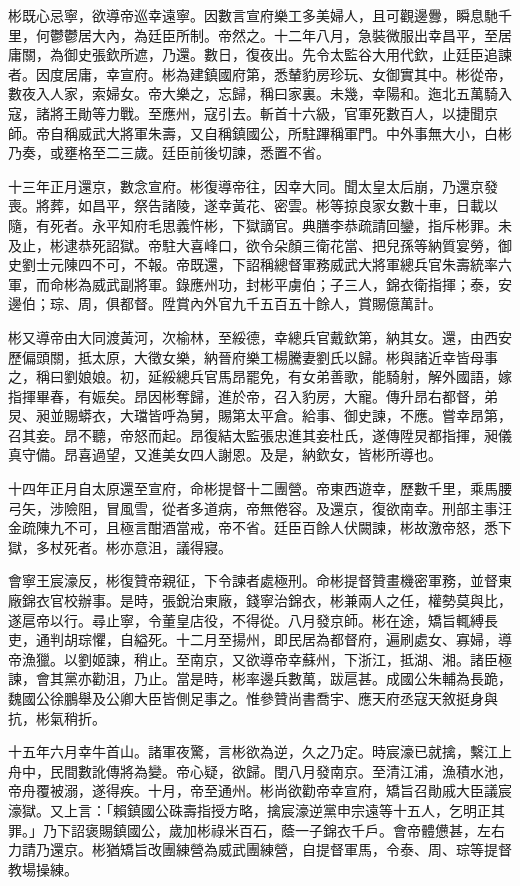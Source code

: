 \begin{pinyinscope}
彬既心忌寧，欲導帝巡幸遠寧。因數言宣府樂工多美婦人，且可觀邊釁，瞬息馳千里，何鬱鬱居大內，為廷臣所制。帝然之。十二年八月，急裝微服出幸昌平，至居庸關，為御史張欽所遮，乃還。數日，復夜出。先令太監谷大用代欽，止廷臣追諫者。因度居庸，幸宣府。彬為建鎮國府第，悉輦豹房珍玩、女御實其中。彬從帝，數夜入人家，索婦女。帝大樂之，忘歸，稱曰家裏。未幾，幸陽和。迤北五萬騎入寇，諸將王勛等力戰。至應州，寇引去。斬首十六級，官軍死數百人，以捷聞京師。帝自稱威武大將軍朱壽，又自稱鎮國公，所駐蹕稱軍門。中外事無大小，白彬乃奏，或壅格至二三歲。廷臣前後切諫，悉置不省。

十三年正月還京，數念宣府。彬復導帝往，因幸大同。聞太皇太后崩，乃還京發喪。將葬，如昌平，祭告諸陵，遂幸黃花、密雲。彬等掠良家女數十車，日載以隨，有死者。永平知府毛思義忤彬，下獄謫官。典膳李恭疏請回鑾，指斥彬罪。未及止，彬逮恭死詔獄。帝駐大喜峰口，欲令朵顏三衛花當、把兒孫等納質宴勞，御史劉士元陳四不可，不報。帝既還，下詔稱總督軍務威武大將軍總兵官朱壽統率六軍，而命彬為威武副將軍。錄應州功，封彬平虜伯；子三人，錦衣衛指揮；泰，安邊伯；琮、周，俱都督。陞賞內外官九千五百五十餘人，賞賜億萬計。

彬又導帝由大同渡黃河，次榆林，至綏德，幸總兵官戴欽第，納其女。還，由西安歷偏頭關，抵太原，大徵女樂，納晉府樂工楊騰妻劉氏以歸。彬與諸近幸皆母事之，稱曰劉娘娘。初，延綏總兵官馬昂罷免，有女弟善歌，能騎射，解外國語，嫁指揮畢春，有娠矣。昂因彬奪歸，進於帝，召入豹房，大寵。傳升昂右都督，弟炅、昶並賜蟒衣，大璫皆呼為舅，賜第太平倉。給事、御史諫，不應。嘗幸昂第，召其妾。昂不聽，帝怒而起。昂復結太監張忠進其妾杜氏，遂傳陞炅都指揮，昶儀真守備。昂喜過望，又進美女四人謝恩。及是，納欽女，皆彬所導也。

十四年正月自太原還至宣府，命彬提督十二團營。帝東西遊幸，歷數千里，乘馬腰弓矢，涉險阻，冒風雪，從者多道病，帝無倦容。及還京，復欲南幸。刑部主事汪金疏陳九不可，且極言酣酒當戒，帝不省。廷臣百餘人伏闕諫，彬故激帝怒，悉下獄，多杖死者。彬亦意沮，議得寢。

會寧王宸濠反，彬復贊帝親征，下令諫者處極刑。命彬提督贊畫機密軍務，並督東廠錦衣官校辦事。是時，張銳治東廠，錢寧治錦衣，彬兼兩人之任，權勢莫與比，遂扈帝以行。尋止寧，令董皇店役，不得從。八月發京師。彬在途，矯旨輒縛長吏，通判胡琮懼，自縊死。十二月至揚州，即民居為都督府，遍刷處女、寡婦，導帝漁獵。以劉姬諫，稍止。至南京，又欲導帝幸蘇州，下浙江，抵湖、湘。諸臣極諫，會其黨亦勸沮，乃止。當是時，彬率邊兵數萬，跋扈甚。成國公朱輔為長跪，魏國公徐鵬舉及公卿大臣皆側足事之。惟參贊尚書喬宇、應天府丞寇天敘挺身與抗，彬氣稍折。

十五年六月幸牛首山。諸軍夜驚，言彬欲為逆，久之乃定。時宸濠已就擒，繫江上舟中，民間數訛傳將為變。帝心疑，欲歸。閏八月發南京。至清江浦，漁積水池，帝舟覆被溺，遂得疾。十月，帝至通州。彬尚欲勸帝幸宣府，矯旨召勛戚大臣議宸濠獄。又上言：「賴鎮國公硃壽指授方略，擒宸濠逆黨申宗遠等十五人，乞明正其罪。」乃下詔褒賜鎮國公，歲加彬祿米百石，蔭一子錦衣千戶。會帝體憊甚，左右力請乃還京。彬猶矯旨改團練營為威武團練營，自提督軍馬，令泰、周、琮等提督教場操練。


\end{pinyinscope}
